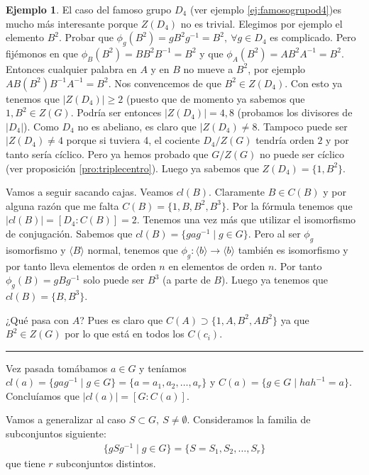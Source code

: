 \documentclass{book}
\theoremstyle{definition}
\newtheorem{ej}{Ejemplo}
\theoremstyle{remark}
\newcommand{\inv}[1]{#1^{-1}}
\newcommand{\hr}{\rule{\textwidth}{.4pt}}
\begin{document}
\begin{ej}
	\label{ej:clasesd4}
	El caso del famoso grupo $D_4$ (ver ejemplo \ref{ej:famosogrupod4})es mucho más interesante porque $Z(D_4)$ no es trivial. Elegimos por ejemplo el elemento $B^2$. Probar que $\phi_g(B^2) = gB^2\inv{g} = B^2,\ \forall g \in D_4$ es complicado. Pero fijémonos en que $\phi_B(B^2) = BB^2\inv{B} = B^2$ y que $\phi_A(B^2) = AB^2\inv{A} = B^2$. Entonces cualquier palabra en $A$ y en $B$ no mueve a $B^2$, por ejemplo $AB(B^2)\inv{B}\inv{A} = B^2$. Nos convencemos de que $B^2 \in Z(D_4)$. Con esto ya tenemos que $|Z(D_4)| \geq 2$ (puesto que de momento ya sabemos que $1, B^2 \in Z(G)$. Podría ser entonces $|Z(D_4)| = 4, 8$ (probamos los divisores de $|D_4|$). Como $D_4$ no es abeliano, es claro que $|Z(D_4) \neq 8$. Tampoco puede ser $|Z(D_4) \neq 4$ porque si tuviera 4, el cociente $D_4/Z(G)$ tendría orden $2$ y por tanto sería cíclico. Pero ya hemos probado que $G/Z(G)$ no puede ser cíclico (ver proposición \ref{pro:triplecentro}). Luego ya sabemos que $Z(D_4) = \{1, B^2\}$.
	
	Vamos a seguir sacando cajas. Veamos $cl(B)$. Claramente $B \in C(B)$ y por alguna razón que me falta $C(B) = \{1, B, B^2, B^3\}$. Por la fórmula tenemos que $|cl(B)| = [D_4:C(B)] = 2$. Tenemos una vez más que utilizar el isomorfismo de conjugación. Sabemos que $cl(B) = \{ga\inv{g} \mid g \in G\}$. Pero al ser $\phi_g$ isomorfismo y $\langle B \rangle$ normal, tenemos que $\phi_g : \langle b \rangle \to \langle b \rangle$ también es isomorfismo y por tanto lleva elementos de orden $n$ en elementos de orden $n$. Por tanto $\phi_g(B) = gB\inv{g}$ solo puede ser $B^3$ (a parte de $B$). Luego ya tenemos que $cl(B) = \{B, B^3\}$.
	
	¿Qué pasa con $A$? Pues es claro que $C(A) \supset \{1, A, B^2, AB^2\}$ ya que $B^2 \in Z(G)$ por lo que está en todos los $C(c_i)$.
\end{ej}


\hr


Vez pasada tomábamos $a \in G$ y teníamos $cl(a) = \{g a \inv{g} \mid g \in G\} = \{a=a_1, a_2, \dots, a_r\}$ y $C(a) = \{g \in G \mid ha\inv{h} = a \}$. Concluíamos que $|cl(a)| = [G:C(a)]$.

Vamos a generalizar al caso $S \subset G,\ S \neq \emptyset$. Consideramos la familia de subconjuntos siguiente:
\begin{align*}
	\{gS\inv{g} \mid g \in G\} = \{S = S_1, S_2, \dots, S_r\}
\end{align*}
que tiene $r$ subconjuntos distintos.
\end{document}
